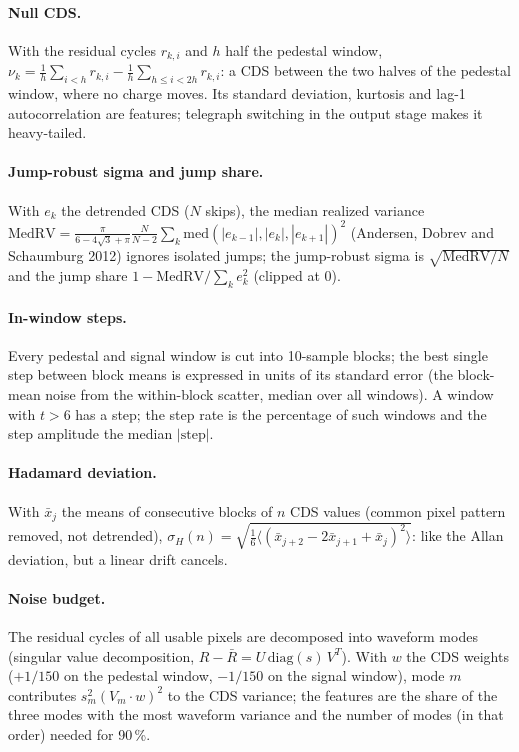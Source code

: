 \documentclass[10pt]{article}
\renewcommand{\_}{\oldunderscore\allowbreak}
\begin{document}
\paragraph{Null CDS.} With the residual cycles $r_{k,i}$ and $h$ half the pedestal window, $\nu_k=\frac{1}{h}\sum_{i<h}r_{k,i}-
\frac{1}{h}\sum_{h\le i<2h}r_{k,i}$: a CDS between the two halves of the pedestal window, where no charge moves. Its standard
deviation, kurtosis and lag-1 autocorrelation are features; telegraph switching in the output stage makes it heavy-tailed.

\paragraph{Jump-robust sigma and jump share.} With $e_k$ the detrended CDS ($N$ skips), the median realized variance
$\mathrm{MedRV}=\frac{\pi}{6-4\sqrt3+\pi}\frac{N}{N-2}\sum_k \mathrm{med}(|e_{k-1}|,|e_k|,|e_{k+1}|)^2$ (Andersen, Dobrev and
Schaumburg 2012) ignores isolated jumps; the jump-robust sigma is $\sqrt{\mathrm{MedRV}/N}$ and the jump share
$1-\mathrm{MedRV}/\sum_k e_k^2$ (clipped at 0).

\paragraph{In-window steps.} Every pedestal and signal window is cut into 10-sample blocks; the best single step between block
means is expressed in units of its standard error (the block-mean noise from the within-block scatter, median over all
windows). A window with $t>6$ has a step; the step rate is the percentage of such windows and the step amplitude the median
$|\text{step}|$.

\paragraph{Hadamard deviation.} With $\bar{x}_j$ the means of consecutive blocks of $n$ CDS values (common pixel pattern
removed, not detrended),
$\sigma_H(n)=\sqrt{\tfrac16\langle(\bar{x}_{j+2}-2\bar{x}_{j+1}+\bar{x}_j)^2\rangle}$: like the Allan deviation, but a linear drift
cancels.

\paragraph{Noise budget.} The residual cycles of all usable pixels are decomposed into waveform modes (singular value
decomposition, $R-\bar R=U\,\mathrm{diag}(s)\,V^T$). With $w$ the CDS weights ($+1/150$ on the pedestal window, $-1/150$ on the
signal window), mode $m$ contributes $s_m^2 (V_m\cdot w)^2$ to the CDS variance; the features are the share of the three modes
with the most waveform variance and the number of modes (in that order) needed for 90\,\%.
\end{document}
